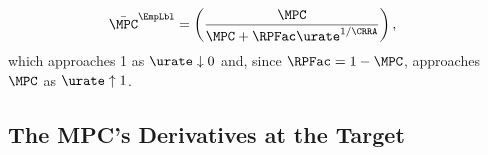 \documentclass{econark}
\begin{document}
\begin{equation}\begin{gathered}\begin{aligned}
  \bar{\MPC}^{\EmpLbl} & = \left(\frac{\MPC}{\MPC+\RPFac\urate^{1/\CRRA}}\right) ,
\end{aligned}\end{gathered}\end{equation}
which approaches 1 as $\urate \downarrow 0$ and, since $\RPFac = 1-\MPC$, approaches $\MPC$ as $\urate \uparrow 1$.

\subsection{The MPC's Derivatives at the Target}\label{sec:TractableBufferStock-MPCDerivatives}
\end{document}
